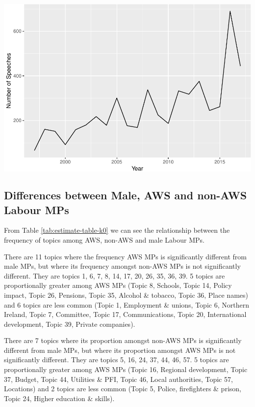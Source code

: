 \documentclass[]{article}
\let\origfigure\figure
\let\endorigfigure\endfigure
\renewenvironment{figure}[1][2] {
    \expandafter\origfigure\expandafter[H]
} {
    \endorigfigure
}
\theoremstyle{definition}
\theoremstyle{definition}
\theoremstyle{definition}
\theoremstyle{remark}
\begin{document}
\begin{figure}
\centering
\includegraphics{methodology_files/figure-latex/eu-plot-1.pdf}
\caption{\label{fig:eu-plot}Number of Speeches in ``European Union'' Topic
per Year}
\end{figure}

\hypertarget{differences-between-male-aws-and-non-aws-labour-mps}{%
\subsection{Differences between Male, AWS and non-AWS Labour
MPs}\label{differences-between-male-aws-and-non-aws-labour-mps}}

From Table \ref{tab:estimate-table-k0} we can see the relationship
between the frequency of topics among AWS, non-AWS and male Labour MPs.

There are 11 topics where the frequency AWS MPs is significantly
different from male MPs, but where its frequency amongst non-AWS MPs is
not significantly different. They are topics 1, 6, 7, 8, 14, 17, 20, 26,
35, 36, 39. 5 topics are proportionally greater among AWS MPs (Topic 8,
Schools, Topic 14, Policy impact, Topic 26, Pensions, Topic 35, Alcohol
\& tobacco, Topic 36, Place names) and 6 topics are less common (Topic
1, Employment \& unions, Topic 6, Northern Ireland, Topic 7, Committee,
Topic 17, Communications, Topic 20, International development, Topic 39,
Private companies).

There are 7 topics where its proportion amongst non-AWS MPs is
significantly different from male MPs, but where its proportion amongst
AWS MPs is not significantly different. They are topics 5, 16, 24, 37,
44, 46, 57. 5 topics are proportionally greater among AWS MPs (Topic 16,
Regional development, Topic 37, Budget, Topic 44, Utilities \& PFI,
Topic 46, Local authorities, Topic 57, Locations) and 2 topics are less
common (Topic 5, Police, firefighters \& prison, Topic 24, Higher
education \& skills).
\end{document}
